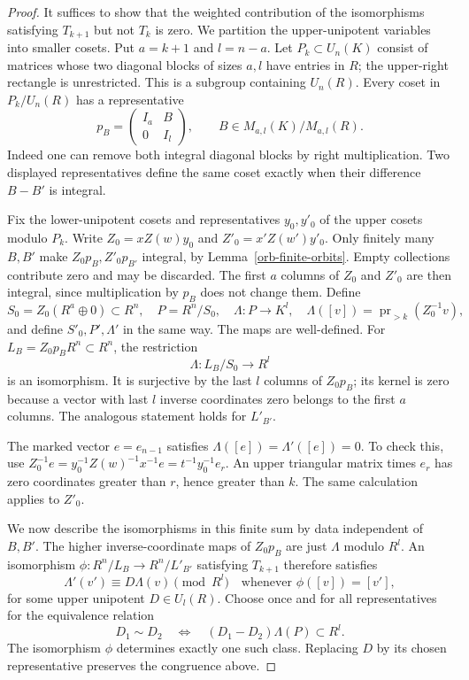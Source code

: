 \begin{proof}
It suffices to show that the weighted contribution of the
isomorphisms satisfying $T_{k+1}$ but not $T_k$ is zero.
We partition the upper-unipotent variables into smaller cosets.
Put $a=k+1$ and $l=n-a$.  Let $P_k\subset U_n(K)$ consist of
matrices whose two diagonal blocks of sizes $a,l$ have entries
in $R$; the upper-right rectangle is unrestricted.  This is a
subgroup containing $U_n(R)$.  Every coset in $P_k/U_n(R)$ has
a representative
\[
 p_B=\begin{pmatrix}I_a&B\\0&I_l\end{pmatrix},
 \qquad B\in M_{a,l}(K)/M_{a,l}(R).
\]
Indeed one can remove both integral diagonal blocks by right
multiplication.  Two displayed representatives define the same
coset exactly when their difference $B-B'$ is integral.

Fix the lower-unipotent cosets and representatives $y_0,y'_0$
of the upper cosets modulo $P_k$.  Write
$Z_0=xZ(w)y_0$ and $Z'_0=x'Z(w')y'_0$.
Only finitely many $B,B'$ make $Z_0p_B,Z'_0p_{B'}$ integral,
by Lemma~\ref{orb-finite-orbits}.  Empty collections contribute
zero and may be discarded.  The first $a$ columns of $Z_0$
and $Z'_0$ are then integral, since multiplication by $p_B$
does not change them.  Define
\[
 S_0=Z_0(R^a\oplus0)\subset R^n,\quad
 P=R^n/S_0,\quad
 \Lambda:P\to K^l,\quad
 \Lambda([v])=\operatorname{pr}_{>k}(Z_0^{-1}v),
\]
and define $S'_0,P',\Lambda'$ in the same way.
The maps are well-defined.  For
$L_B=Z_0p_BR^n\subset R^n$, the restriction
\begin{equation}\label{orb-tail-section}
 \Lambda:L_B/S_0\longrightarrow R^l
\end{equation}
is an isomorphism.  It is surjective by the last $l$ columns
of $Z_0p_B$; its kernel is zero because a vector with last
$l$ inverse coordinates zero belongs to the first $a$ columns.
The analogous statement holds for $L'_{B'}$.

The marked vector $e=e_{n-1}$ satisfies
$\Lambda([e])=\Lambda'([e])=0$.
To check this, use
$Z_0^{-1}e=y_0^{-1}Z(w)^{-1}x^{-1}e
=t^{-1}y_0^{-1}e_r$.
An upper triangular matrix times $e_r$ has zero coordinates
greater than $r$, hence greater than $k$.  The same calculation
applies to $Z'_0$.

We now describe the isomorphisms in this finite sum by data
independent of $B,B'$.  The higher inverse-coordinate maps of
$Z_0p_B$ are just $\Lambda$ modulo $R^l$.
An isomorphism
$\phi:R^n/L_B\to R^n/L'_{B'}$ satisfying $T_{k+1}$ therefore
satisfies
\[
 \Lambda'(v')\equiv D\Lambda(v)\pmod{R^l}
 \quad\text{whenever }\phi([v])=[v'],
\]
for some upper unipotent $D\in U_l(R)$.
Choose once and for all representatives for the equivalence
relation
\[
 D_1\sim D_2\quad\Longleftrightarrow\quad
 (D_1-D_2)\Lambda(P)\subset R^l.
\]
The isomorphism $\phi$ determines exactly one such class.
Replacing $D$ by its chosen representative preserves the
congruence above.


\end{proof}
